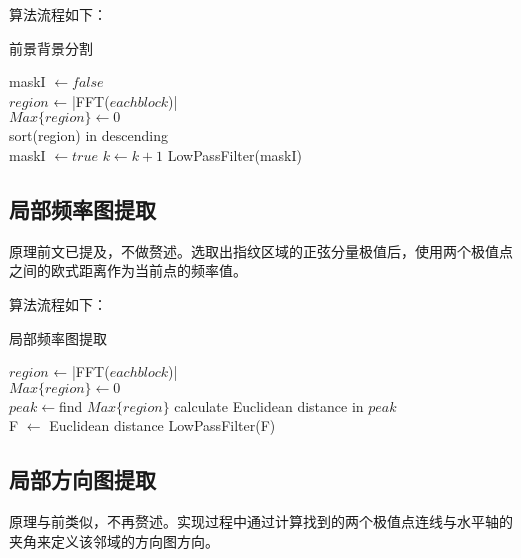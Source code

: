 \documentclass[UTF8]{ctexart}
\begin{document}
算法流程如下：

\begin{algorithm}[H]
    \caption{前景背景分割}
    {
        maskI $\leftarrow false$\\
        $region$ ← |FFT($eachblock$)|\\
        $Max\{region\} \leftarrow  0$ \\
        sort(region) in descending\\
        {
            {
                {
                    maskI $\leftarrow true$
                }
            }
            $k \leftarrow k +1$
        }
    }
    LowPassFilter(maskI)

\end{algorithm}


\subsection{局部频率图提取}
原理前文已提及，不做赘述。选取出指纹区域的正弦分量极值后，使用两个极值点之间的欧式距离作为当前点的频率值。

算法流程如下：

\begin{algorithm}[H]
    \caption{局部频率图提取}
    {
        $region$ ← |FFT($eachblock$)|\\
        $Max\{region\} \leftarrow  0$ \\
        {
            $peak \leftarrow $find $Max\{region\}$
        }
        calculate Euclidean distance in $peak$ \\
        F $\leftarrow$ Euclidean distance
    }
    LowPassFilter(F)

\end{algorithm}

\subsection{局部方向图提取}
原理与前类似，不再赘述。实现过程中通过计算找到的两个极值点连线与水平轴的夹角来定义该邻域的方向图方向。
\end{document}
